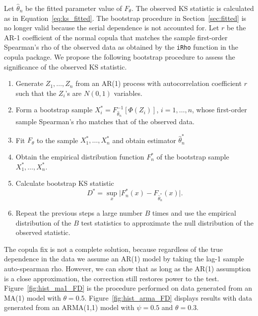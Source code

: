 \documentclass[12pt, letterpaper, titlepage]{article}
\begin{document}
Let $\hat\theta_n$ be the fitted parameter value of $F_{\theta}$. The observed
KS statistic is calculated as in Equation~\eqref{eq:ks_fitted}. The bootstrap
procedure in Section~\ref{sec:fitted} is no longer valid because the serial
dependence is not accounted for. Let $r$ be the
AR-1 coefficient of the normal copula that matches the sample first-order
Spearman's rho of the observed data as obtained by the \texttt{iRho} function in
the \textsf{copula} package. We propose the following bootstrap procedure to
assess the significance of the observed KS statistic.
\begin{enumerate}
\item
  Generate $Z_1, \ldots, Z_n$ from an AR(1) process with autocorrelation
  coefficient $r$ such that the $Z_i$'s are $N(0, 1)$ variables.
\item
  Form a bootstrap sample $X_i^* = F^{-1}_{\hat\theta_n} [\Phi(Z_i)]$,
  $i = 1, \ldots, n$, whose first-order sample Spearman's rho matches that of
  the observed data.
\item
  Fit $F_\theta$ to the sample $X_1^*, \ldots, X_n^*$ and obtain estimator $\hat\theta_n^*$
\item
  Obtain the empirical distribution function $F_n^*$ of the bootstrap sample
  $X_1^*, \ldots, X_n^*$.
\item 
  Calculate bootstrap KS statistic
  \[
    D^* = \sup_x \lvert F_n^* (x)- F_{\hat\theta_n^*}(x) \rvert.
  \]
\item
  Repeat the previous steps a large number $B$ times and use the empirical
    distribution of the $B$ test statistics to approximate
    the null distribution of the observed statistic.      
\end{enumerate}


The copula fix is not a complete solution, because regardless of the true dependence in the data
we assume an AR(1) model by taking the lag-1 sample auto-spearman rho. However, we can 
show that as long as the AR(1) assumption is a close approximation, the correction still restores power to the test.
Figure~\ref{fig:hist_ma1_FD} is the procedure performed on data generated from 
an MA(1) model with $\theta = 0.5$. Figure~\ref{fig:hist_arma_FD} displays results with 
data generated from an ARMA(1,1) model with $\psi = 0.5$ and $\theta = 0.3$. 
\end{document}

